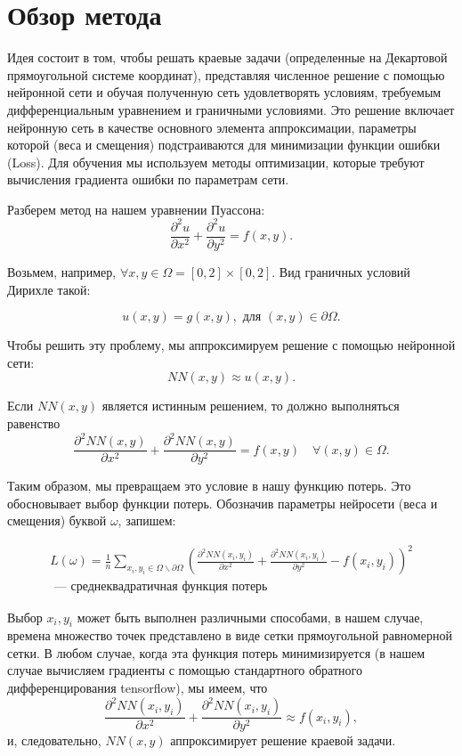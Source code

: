 \section{Обзор метода}

Идея состоит в том, чтобы решать краевые задачи (определенные на Декартовой прямоугольной системе координат), представляя численное решение с помощью нейронной сети и обучая полученную сеть удовлетворять условиям, требуемым дифференциальным уравнением и граничными условиями.
Это решение включает нейронную сеть в качестве основного элемента аппроксимации, параметры которой (веса и смещения) подстраиваются для минимизации функции ошибки (Loss). Для обучения мы используем методы оптимизации, которые требуют вычисления градиента ошибки по параметрам сети.

\medskip
\medskip

Разберем метод на нашем уравнении Пуассона:
\[
    \frac{\partial^2 u}{\partial x^2} + \frac{\partial^2 u}{\partial y^2} = f(x, y).
\]

Возьмем, например, $\forall x, y \in \Omega=[0, 2] \times [0, 2]$.  Вид граничных условий Дирихле такой:

\[
    u(x, y) = g(x, y), \text{ для } (x, y) \in \partial \Omega.
\]

Чтобы решить эту проблему, мы аппроксимируем решение с помощью нейронной сети:
\[
    NN(x, y) \approx u(x, y).
\]

Если $ NN(x, y) $ является истинным решением, то должно выполняться равенство
\[
    \frac{\partial^2 NN(x, y)}{\partial x^2}  +\frac{\partial^2 NN(x, y)}{\partial y^2} = f(x, y) \quad \forall (x, y) \in \Omega.
\]

Таким образом, мы превращаем это условие в нашу функцию потерь. Это обосновывает выбор функции потерь. Обозначив параметры нейросети (веса и смещения) буквой $\omega$, запишем:

\[
    \begin{split}
        L(\omega) = \frac{1}{n} \sum_{x_i,y_i \in \Omega \backslash \partial \Omega}
        \left( \frac{\partial^2 NN(x_i, y_i)}{\partial x^2} +\frac{\partial^2 NN(x_i,
        y_i)}{\partial y^2} - f(x_i, y_i) \right)^2 \\
        \text{ --- среднеквадратичная функция потерь}
    \end{split}
\]

Выбор $ x_i, y_i $ может быть выполнен различными способами, в нашем случае, времена множество точек представлено в виде сетки прямоугольной равномерной сетки. В любом случае, когда эта функция потерь минимизируется (в нашем случае вычисляем градиенты с помощью стандартного обратного дифференцирования \textrm{tensorflow}), мы имеем, что
\[
    \frac{\partial^2 NN(x_i, y_i)}{\partial x^2}  +\frac{\partial^2 NN(x_i, y_i)}{\partial y^2} \approx f(x_i, y_i),
\]
и, следовательно, $ NN(x, y) $ аппроксимирует решение краевой задачи.

